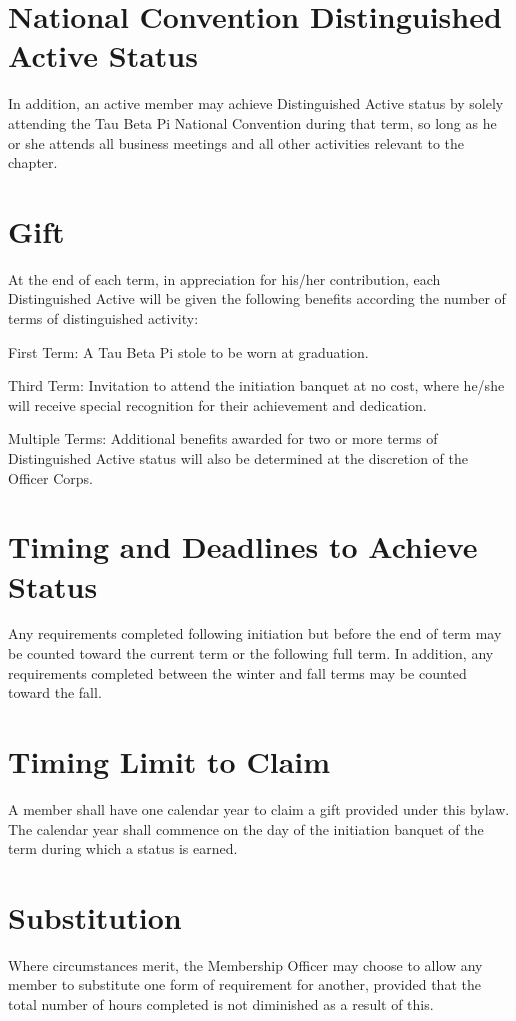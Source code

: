 \section{National Convention Distinguished Active Status} In addition, an active member may achieve Distinguished Active status by solely attending the Tau Beta Pi National Convention during that term, so long as he or she attends all business meetings and all other activities relevant to the chapter.
\section{Gift} At the end of each term, in appreciation for his/her contribution, each Distinguished Active will be given the following benefits according the number of terms of distinguished activity:
\begin{enumsubsection}
\item{First Term:} A Tau Beta Pi stole to be worn at graduation.
\item{Third Term:}  Invitation to attend the initiation banquet at no cost, where he/she will receive special recognition for their achievement and dedication. 
\item{Multiple Terms:} Additional benefits awarded for two or more  terms of Distinguished Active status will also be determined at the discretion of the Officer Corps. 
\end{enumsubsection}
\section{Timing and Deadlines to Achieve Status} Any requirements completed following initiation but before the end of term may be counted toward the current term or the following full term. In addition, any requirements completed between the winter and fall terms may be counted toward the fall. 
\section{Timing Limit to Claim} A member shall have one calendar year to claim a gift provided under this bylaw. The calendar year shall commence on the day of the initiation banquet of the term during which a status is earned.
\section{Substitution} Where circumstances merit, the Membership Officer may choose to allow any member to substitute one form of requirement for another, provided that the total number of hours completed is not diminished as a result of this.

